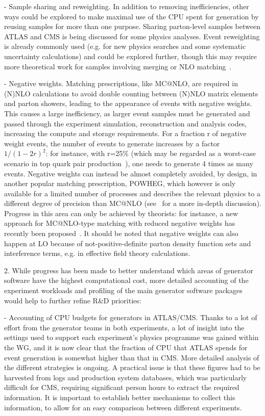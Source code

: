 \documentclass[11pt,a4paper]{article}
\begin{document}
- {Sample sharing and reweighting}. In addition to removing
inefficiencies, other ways could be explored to make maximal use of the
CPU spent for generation by reusing samples for more than one purpose.
Sharing parton-level samples between ATLAS and CMS is being discussed
for some physics analyses. Event reweighting is already commonly used
(e.g. for new physics searches and some systematic uncertainty
calculations) and could be explored further, though this may require
more theoretical work for samples involving merging or NLO matching~\cite{Mat16}.

- {Negative weights}. Matching prescriptions, like MC@NLO, are required
in (N)NLO calculations to avoid double counting between (N)NLO matrix
elements and parton showers, leading to the appearance of events with
negative weights. This causes a large inefficiency, as larger event
samples must be generated and passed through the experiment simulation,
reconstruction and analysis codes, increasing the compute and storage
requirements. For a fraction r of negative weight events, the number of
events to generate increases by a factor $1/(1-2r)^2$: for instance,
with r=25\% (which may be regarded as a worst-case scenario in top quark
pair production~\cite{Fre20}), one needs to generate 4 times as many
events. Negative weights can instead be almost completely avoided, by
design, in another popular matching prescription, POWHEG, which however
is only available for a limited number of processes and describes the
relevant physics to a different degree of precision than MC@NLO 
(see~\cite{Fre20} for a more in-depth discussion). Progress in this area can
only be achieved by theorists: for instance, a new approach for
MC@NLO-type matching with reduced negative weights has recently been
proposed~\cite{Fre20}. It should be noted that negative weights can also
happen at LO because of not-positive-definite parton density function
sets and interference terms, e.g. in effective field theory
calculations.

2. While progress has been made to better understand which areas of
generator software have the highest computational cost, more detailed
accounting of the experiment workloads and profiling of the main
generator software packages would help to further refine R\&D
priorities:

- {Accounting of CPU budgets for generators in ATLAS/CMS}. Thanks to a
lot of effort from the generator teams in both experiments, a lot of
insight into the settings used to support each experiment's physics
programme was gained within the WG, and it is now clear that the
fraction of CPU that ATLAS spends for event generation is somewhat
higher than that in CMS. More detailed analysis of the different
strategies is ongoing. A practical issue is that these figures had to be
harvested from logs and production system databases, which was
particularly difficult for CMS, requiring significant person hours to
extract the required information. It is important to establish better
mechanisms to collect this information, to allow for an easy comparison
between different experiments.
\end{document}
